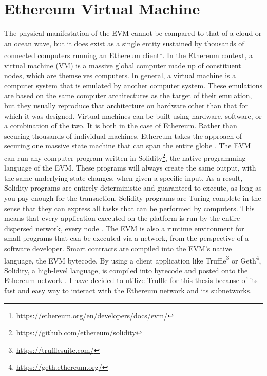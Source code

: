 \section{Ethereum Virtual Machine}
\label{sec:evm}
The physical manifestation of the EVM cannot be compared to that of a cloud or an ocean wave, but it does exist as a single entity sustained by thousands of connected computers running an Ethereum client\footnote{\url{https://ethereum.org/en/developers/docs/evm/}}.
In the Ethereum context, a virtual machine (VM) is a massive global computer made up of constituent nodes, which are themselves computers. In general, a virtual machine is a computer system that is emulated by another computer system. These emulations are based on the same computer architectures as the target of their emulation, but they usually reproduce that architecture on hardware other than that for which it was designed. Virtual machines can be built using hardware, software, or a combination of the two. It is both in the case of Ethereum. Rather than securing thousands of individual machines, Ethereum takes the approach of securing one massive state machine that can span the entire globe \cite[48]{dannen2017introducing}.
The EVM can run any computer program written in Solidity\footnote{\url{https://github.com/ethereum/solidity}}, the native programming language of the EVM. These programs will always create the same output, with the same underlying state changes, when given a specific input. As a result, Solidity programs are entirely deterministic and guaranteed to execute, as long as you pay enough for the transaction. Solidity programs are Turing complete in the sense that they can express all tasks that can be performed by computers. This means that every application executed on the platform is run by the entire dispersed network, every node \cite[50]{dannen2017introducing}. 
The EVM is also a runtime environment for small programs that can be executed via a network, from the perspective of a software developer. Smart contracts are compiled into the EVM's native language, the EVM bytecode. By using a client application like Truffle\footnote{\url{https://trufflesuite.com/}} or Geth\footnote{\url{https://geth.ethereum.org/}}, Solidity, a high-level language, is compiled into bytecode and posted onto the Ethereum network \cite[51]{dannen2017introducing}. I have decided to utilize Truffle for this thesis because of its fast and easy way to interact with the Ethereum network and its subnetworks.
